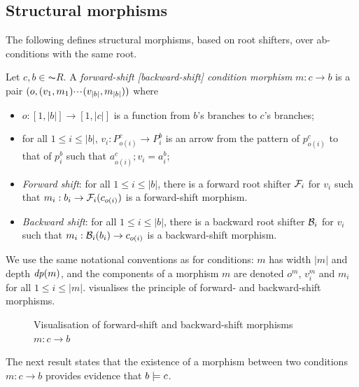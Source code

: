 \subsection{Structural morphisms}

The following defines structural morphisms, based on root shifters, over ab-conditions with the same root.

\begin{definition}\label{def:ab-morphism}
  Let $c,b \in \AC{R}$. A \emph{forward-shift [backward-shift] condition morphism} $m: c \to b$ is a pair $(o,(v_1,m_1){\cdotp\mkern-2mu\cdotp\mkern-2mu\cdotp\mkern1mu} (v_{|b|},m_{|b|}))$ where
  \begin{itemize}[topsep=\smallskipamount]
  \item $o:[1,|b|]\to[1,|c|]$ is a function from $b$'s branches to $c$'s branches;
  \item for all $1\leq i\leq |b|$, $v_i:P^c_{o(i)}\to P^b_i$ is an arrow from the pattern of $p^c_{o(i)}$ to that of $p^b_i$ such that $a^c_{o(i)};v_i=a^b_i$;
  \item\emph{Forward shift}: for all $1\leq i\leq |b|$, there is a forward root shifter $\mathcal{F}_i$ for $v_i$ such that $m_i:b_i \rightarrow \mathcal{F}_i(c_{o(i)})$ is a forward-shift morphism.
  \item\emph{Backward shift}: for all $1\leq i\leq |b|$, there is a backward root shifter $\mathcal{B}_i$ for $v_i$ such that $m_i:\mathcal{B}_i(b_i) \rightarrow c_{o(i)}$ is a backward-shift morphism.
  \end{itemize}
\end{definition}
%
We use the same notational conventions as for conditions: $m$ has width $|m|$ and depth $\mathit{dp}(m)$, and the components of a morphism $m$ are denoted $o^m$, $v^m_i$ and $m_i$ for all $1\leq i\leq |m|$.  visualises the principle of forward- and backward-shift morphisms.
%
\begin{figure}[t]
\centering

\caption{Visualisation of forward-shift and backward-shift morphisms $m:c \to b$}
\end{figure}
%
The next result states that the existence of a morphism between two conditions $m: c \to b$ provides evidence that $b\models c$.

